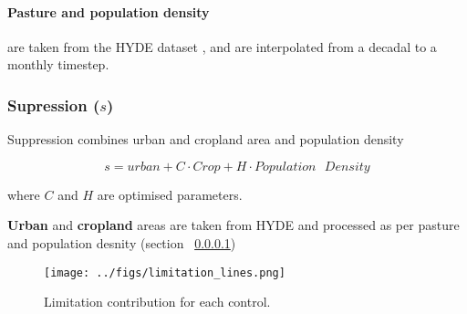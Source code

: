 \paragraph{Pasture and population density}
\label{Pasture}
are taken from the HYDE dataset \citep{klein2007mapping}, and are interpolated from a decadal to a monthly timestep.

\subsubsection{Supression ($s$)}

Suppression combines urban and cropland area and population density

\begin{equation}
    s = urban + C \cdot Crop + H \cdot Population\text{ }Density
    \label{equ:Supression}
\end{equation}

where $C$ and $H$ are optimised parameters.

\textbf{Urban} and \textbf{cropland} areas are taken from HYDE and processed as per pasture and population desnity (section ~\ref{Pasture})


\begin{figure}[!ht]
\begin{shaded}
  \centering
    \texttt{[image: ../figs/limitation\_lines.png]}

  \caption{Limitation contribution for each control.}
  \label{fig:lim_lines}
\end{shaded}

\end{figure}

